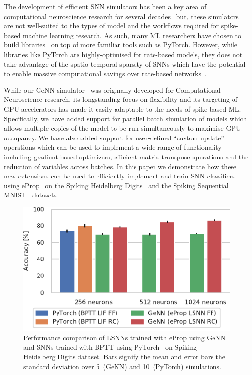 \documentclass[sigconf]{acmart}
\begin{document}
The development of efficient SNN simulators has been a key area of computational neuroscience research for several decades~\citep{carnevale2006neuron, Gewaltig2007, Golosio2021, Akar2019,Yavuz2016} but, these simulators are not well-suited to the types of model and the workflows required for spike-based machine learning research.
As such, many ML researchers have chosen to build libraries~\citep{norse2021, SpikingJelly, eshraghian2021training,Hazan2018} on top of more familiar tools such as PyTorch.
However, while libraries like PyTorch are highly-optimised for rate-based models, they does not take advantage of the spatio-temporal sparsity of SNNs which have the potential to enable massive computational savings over rate-based networks~\citep{Yin2021}.

While our GeNN simulator~\citep{Yavuz2016,Knight2018,Knight2021} was originally developed for Computational Neuroscience research, its longstanding focus on flexibility and its targeting of GPU accelerators has made it easily adaptable to the needs of spike-based ML.
Specifically, we have added support for parallel batch simulation of models which allows multiple copies of the model to be run simultaneously to maximise GPU occupancy.
We have also added support for user-defined ``custom update'' operations which can be used to implement a wide range of functionality including gradient-based optimizers, efficient matrix transpose operations and the reduction of variables across batches.
In this paper we demonstrate how these new extensions can be used to efficiently implement and train SNN classifiers using eProp~\citep{Bellec2020} on the Spiking Heidelberg Digits~\citep{Cramer2020} and the Spiking Sequential MNIST~\citep{Plank2021} datasets.

\begin{figure}[t]
  \centering
  \includegraphics{figures/shd_performance.pdf}
  \caption{Performance comparison of  LSNNs trained with eProp using GeNN and SNNs trained with BPTT using PyTorch~\citep{Zenke2021a} on Spiking Heidelberg Digits dataset.
  Bars signify the mean and error bars the standard deviation over 5~(GeNN) and 10~(PyTorch) simulations.}
  \label{fig:shd_performance}
\end{figure}
\end{document}
